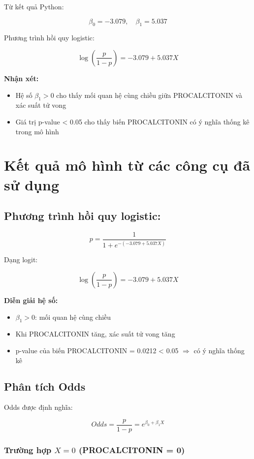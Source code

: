Từ kết quả Python:

\[
\beta_0 = -3.079,\quad \beta_1 = 5.037
\]

Phương trình hồi quy logistic:

\[
\log\left(\frac{p}{1-p}\right) = -3.079 + 5.037X
\]

\textbf{Nhận xét:}

\begin{itemize}
\item Hệ số $\beta_1 > 0$ cho thấy mối quan hệ cùng chiều giữa PROCALCITONIN và xác suất tử vong
\item Giá trị p-value < 0.05 cho thấy biến PROCALCITONIN có ý nghĩa thống kê trong mô hình
\end{itemize}

\section{Kết quả mô hình từ các công cụ đã sử dụng}

\subsection{Phương trình hồi quy logistic:}

\[
p = \frac{1}{1 + e^{-(-3.079 + 5.037X)}}
\]

Dạng logit:

\[
\log\left(\frac{p}{1-p}\right) = -3.079 + 5.037X
\]

\textbf{Diễn giải hệ số:}

\begin{itemize}
\item $\beta_1 > 0$: mối quan hệ cùng chiều
\item Khi PROCALCITONIN tăng, xác suất tử vong tăng
\item p-value của biến PROCALCITONIN = 0.0212 < 0.05 $\Rightarrow$ có ý nghĩa thống kê
\end{itemize}

\subsection{Phân tích Odds}

Odds được định nghĩa:

\[
Odds = \frac{p}{1-p} = e^{\beta_0 + \beta_1 X}
\]

\subsubsection{Trường hợp $X = 0$ (PROCALCITONIN = 0)}

